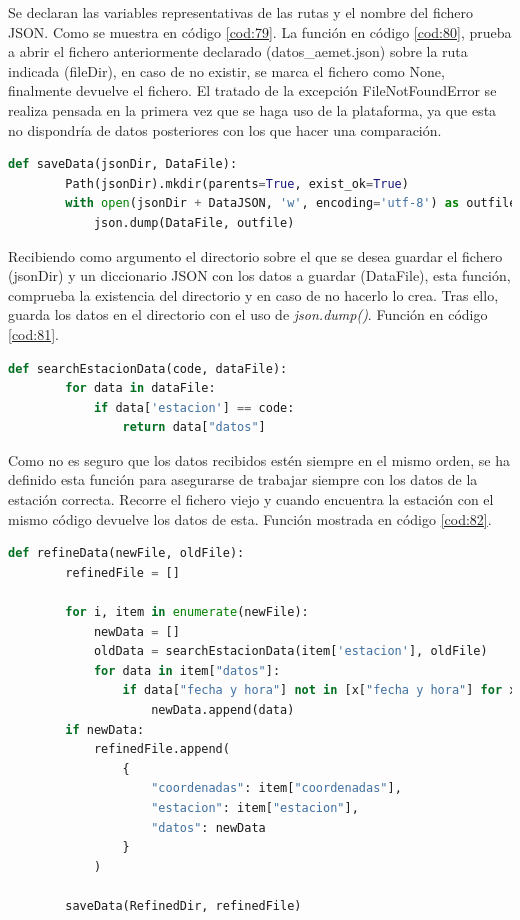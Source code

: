 Se declaran las variables representativas de las rutas y el nombre del fichero JSON. Como se muestra en código \ref{cod:79}. La función en código \ref{cod:80}, prueba a abrir el fichero anteriormente declarado (datos\_aemet.json) sobre la ruta indicada (fileDir), en caso de no existir, se marca el fichero como None, finalmente devuelve el fichero. El tratado de la excepción FileNotFoundError se realiza pensada en la primera vez que se haga uso de la plataforma, ya que esta no dispondría de datos posteriores con los que hacer una comparación.

\begin{lstlisting}[language=Python, caption={Declaración función saveFile()}, label=cod:81]
	def saveData(jsonDir, DataFile):
		Path(jsonDir).mkdir(parents=True, exist_ok=True)
		with open(jsonDir + DataJSON, 'w', encoding='utf-8') as outfile:
			json.dump(DataFile, outfile)
\end{lstlisting}

Recibiendo como argumento el directorio sobre el que se desea guardar el fichero (jsonDir) y un diccionario JSON con los datos a guardar (DataFile), esta función, comprueba la existencia del directorio y en caso de no hacerlo lo crea. Tras ello, guarda los datos en el directorio con el uso de \textit{json.dump()}. Función en código \ref{cod:81}.

\begin{lstlisting}[language=Python, caption={Declaración función searchEstacionData()}, label=cod:82]
	def searchEstacionData(code, dataFile):
		for data in dataFile:
			if data['estacion'] == code:
				return data["datos"]
\end{lstlisting}

Como no es seguro que los datos recibidos estén siempre en el mismo orden, se ha definido esta función para asegurarse de trabajar siempre con los datos de la estación correcta. Recorre el fichero viejo y cuando encuentra la estación con el mismo código devuelve los datos de esta. Función mostrada en código \ref{cod:82}.

\begin{lstlisting}[language=Python, caption={Declaración función refinedData()}, label=cod:83]
	def refineData(newFile, oldFile):
		refinedFile = []
		
		for i, item in enumerate(newFile):
			newData = []
			oldData = searchEstacionData(item['estacion'], oldFile)
			for data in item["datos"]:
				if data["fecha y hora"] not in [x["fecha y hora"] for x in oldData]:
					newData.append(data)
		if newData:
			refinedFile.append(
				{
					"coordenadas": item["coordenadas"],
					"estacion": item["estacion"],
					"datos": newData
				}
			)
		
		saveData(RefinedDir, refinedFile)
\end{lstlisting}

